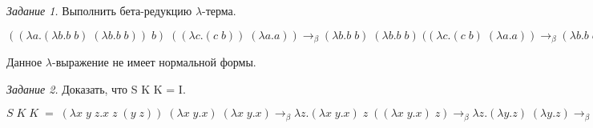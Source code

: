 \documentclass[a4paper,12pt,twoside]{article}
\begin{document}
\begin{large} \textit{Задание 1.} Выполнить бета-редукцию $\lambda$-терма.\end{large} 
\newline

$((\lambda a.(\lambda b.b\;b)\;(\lambda b.b\;b))\;b)\;((\lambda c.(c\;b))\;(\lambda a.a)) \longrightarrow_{\beta} (\lambda b.b\;b)\;(\lambda b.b\;b)\;((\lambda c.(c\;b)\;(\lambda a.a))\longrightarrow_{\beta} (\lambda b.b\;b)\;(\lambda b.b\;b)\;((\lambda a.a)\;b) \longrightarrow_{\beta} (\lambda b.b\;b)\;(\lambda b.b\;b)\;b \longrightarrow_{\beta} (\lambda b.b\;b)\;(\lambda b.b\;b)\;b \longrightarrow_{\beta}~...$
\newline 

Данное $\lambda$-выражение не имеет нормальной формы.
\newline

\begin{large} \textit{Задание 2.} Доказать, что  S K K = I. \end{large} 
\newline

$S\;K\;K\;=\;(\lambda x\;y\;z.x\;z\;(y\;z))\;(\lambda x\;y.x)\;(\lambda x\;y.x) \longrightarrow_{\beta} \lambda z.(\lambda x\;y.x)\;z\;((\lambda x\;y.x)\;z) \longrightarrow_{\beta} \lambda z.(\lambda y.z)\;(\lambda y.z) \longrightarrow_{\beta} \lambda z.z\;=\;I$
\end{document}
